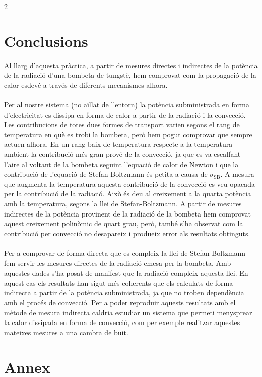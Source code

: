 \documentclass[12pt,twosides,onecolumn,openany]{article}
\begin{document}
\begin{multicols}{2}
\section{Conclusions}
Al llarg d'aquesta pràctica, a partir de mesures directes i indirectes de la potència de la radiació d'una bombeta de tungstè, hem comprovat com la propagació de la calor esdevé a través de diferents mecanismes alhora.\\\\
Per al nostre sistema (no aïllat de l'entorn) la potència subministrada en forma d'electricitat es dissipa en forma de calor a partir de la radiació i la convecció. Les contribucions de totes dues formes de transport varien segons el rang de temperatura en què es trobi la bombeta, però hem pogut comprovar que sempre actuen alhora. En un rang baix de temperatura respecte a la temperatura ambient la contribució més gran prové de la convecció, ja que es va escalfant l'aire al voltant de la bombeta seguint l'equació de calor de Newton i que la contribució de l'equació de Stefan-Boltzmann és petita a causa de $\sigma_{\text{SB}}$. A mesura que augmenta la temperatura aquesta contribució de la convecció es veu opacada per la contribució de la radiació. Això és deu al creixement a la quarta potència amb la temperatura, segons la llei de Stefan-Boltzmann. A partir de mesures indirectes de la potència provinent de la radiació de la bombeta hem comprovat aquest creixement polinòmic de quart grau, però, també s'ha observat com la contribució per convecció no desapareix i produeix error als resultats obtinguts.\\\\
Per a comprovar de forma directa que es compleix la llei de Stefan-Boltzmann fem servir les mesures directes de la radiació emesa per la bombeta. Amb aquestes dades s'ha posat de manifest que la radiació compleix aquesta llei. En aquest cas els resultats han sigut més coherents que els calculats de forma indirecta a partir de la potència subministrada, ja que no troben dependència amb el procés de convecció. Per a poder reproduir aquests resultats amb el mètode de mesura indirecta caldria estudiar un sistema que permeti menysprear la calor dissipada en forma de convecció, com per exemple realitzar aquestes mateixes mesures a una cambra de buit.
\section{Annex}

\end{multicols}
\end{document}
